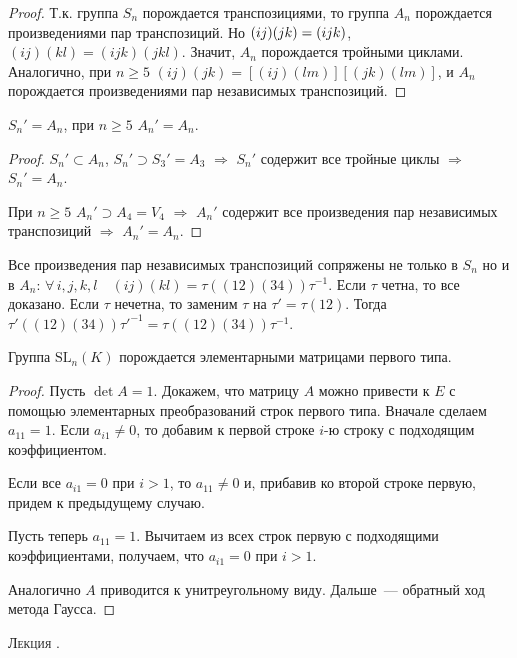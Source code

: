 \documentclass[a4paper]{article}
\newcounter{lec}
\renewcommand{\thelec}{\Roman{lec}}
\newcommand*{\lecture}[1]{\refstepcounter{lec}\vspace{20pt}
\begin{center}{\rmfamily\textsc{Лекция \thelec. \\ \textbf{#1}}}\vspace{5pt}
\end{center}}
\newcommand*{\p}[1]{#1\nobreak\discretionary{}{\hbox{$\mathsurround=0pt #1$}}{}}
\begin{document}
\begin{proof}
Т.к. группа $S_n$ порождается транспозициями, то группа $A_n$
порождается произведениями пар транспозиций. Но $(ij)(jk)\p=(ijk)$,
$(ij)(kl)=(ijk)(jkl)$. Значит, $A_n$ порождается тройными циклами.
Аналогично, при $n\geqslant 5$ $(ij)(jk)=[(ij)(lm)][(jk)(lm)]$, и
$A_n$ порождается произведениями пар независимых транспозиций.
\end{proof}

\begin{theorem}
$S_n'=A_n$, при $n\geqslant 5$ $A_n'=A_n$.
\end{theorem}

\begin{proof}
$S_n'\subset A_n$, $S_n'\supset S_3'=A_3$ $\Rightarrow$ $S_n'$
содержит все тройные циклы $\Rightarrow$ $S_n'=A_n$.

При $n\geqslant 5$ $A_n'\supset A_4=V_4$ $\Rightarrow$ $A_n'$
содержит все произведения пар независимых транспозиций $\Rightarrow$
$A_n'=A_n$.
\end{proof}

\begin{zam}
Все произведения пар независимых транспозиций сопряжены не только в
$S_n$ но и в $A_n$: $\forall \, i,j,k,l\quad
(ij)(kl)=\tau((12)(34))\tau^{-1}$. Если $\tau$ четна, то все
доказано. Если $\tau$ нечетна, то заменим $\tau$ на
$\tau'=\tau(12)$. Тогда
$\tau'((12)(34))\tau'^{-1}=\tau((12)(34))\tau^{-1}$.
\end{zam}

\begin{lemm}
\label{2.IX}Группа $\mathrm{SL}_n(K)$ порождается элементарными
матрицами первого типа.
\end{lemm}

\begin{proof}
Пусть $\det A=1$. Докажем, что матрицу $A$ можно привести к $E$ с
помощью элементарных преобразований строк первого типа. Вначале
сделаем $a_{11}=1$. Если $a_{i1}\neq 0$, то добавим к первой строке
$i$-ю строку с подходящим коэффициентом.

Если все $a_{i1}=0$ при $i>1$, то $a_{11}\neq 0$ и, прибавив ко
второй строке первую, придем к предыдущему случаю.

Пусть теперь $a_{11}=1$. Вычитаем из всех строк первую с подходящими
коэффициентами, получаем, что $a_{i1}=0$ при $i>1$.

Аналогично $A$ приводится к унитреугольному виду. Дальше~---
обратный ход метода Гаусса.
\end{proof}
\lecture{}
\end{document}
